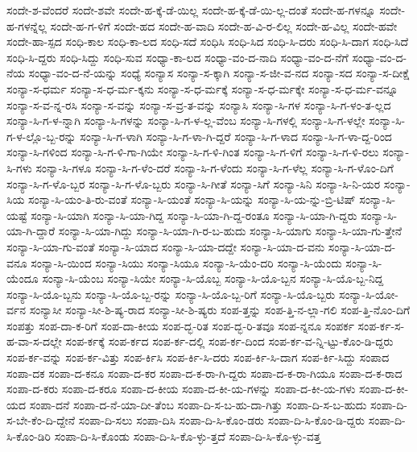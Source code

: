 {ಸಂದೇ-ಶ-ವೆಂದರೆ
ಸಂದೇ-ಶವೇ
ಸಂದೇ-ಹ-ಕ್ಕೆ-ಡೆ-ಯಿಲ್ಲ
ಸಂದೇ-ಹ-ಕ್ಕೆ-ಡೆ-ಯಿ-ಲ್ಲ-ದಂತೆ
ಸಂದೇ-ಹ-ಗಳನ್ನೂ
ಸಂದೇ-ಹ-ಗಳನ್ನೆಲ್ಲ
ಸಂದೇ-ಹ-ಗ-ಳಿಗೆ
ಸಂದೇ-ಹದ
ಸಂದೇ-ಹ-ವಾದಿ
ಸಂದೇ-ಹ-ವಿ-ರ-ಲಿಲ್ಲ
ಸಂದೇ-ಹ-ವಿಲ್ಲ
ಸಂದೇ-ಹವೇ
ಸಂದೇ-ಹಾ-ಸ್ಪದ
ಸಂಧಿ-ಕಾಲ
ಸಂಧಿ-ಕಾ-ಲದ
ಸಂಧಿ-ಸದೆ
ಸಂಧಿಸಿ
ಸಂಧಿ-ಸಿದ
ಸಂಧಿ-ಸಿ-ದರು
ಸಂಧಿ-ಸಿ-ದಾಗ
ಸಂಧಿ-ಸಿದೆ
ಸಂಧಿ-ಸಿ-ದ್ದರು
ಸಂಧಿ-ಸಿದ್ದು
ಸಂಧಿ-ಸುವ
ಸಂಧ್ಯಾ-ಕಾ-ಲದ
ಸಂಧ್ಯಾ-ವಂ-ದ-ನಾದಿ
ಸಂಧ್ಯಾ-ವಂ-ದ-ನೆಗೆ
ಸಂಧ್ಯಾ-ವಂ-ದ-ನೆಯ
ಸಂಧ್ಯಾ-ವಂ-ದ-ನೆ-ಯನ್ನು
ಸಂಧ್ಯೆ
ಸಂನ್ಯಾಸ
ಸಂನ್ಯಾ-ಸ-ಕ್ಕಾಗಿ
ಸಂನ್ಯಾ-ಸ-ಜೀ-ವ-ನದ
ಸಂನ್ಯಾ-ಸದ
ಸಂನ್ಯಾ-ಸ-ದೀಕ್ಷೆ
ಸಂನ್ಯಾ-ಸ-ಧರ್ಮ
ಸಂನ್ಯಾ-ಸ-ಧ-ರ್ಮ-ಕ್ಕನು
ಸಂನ್ಯಾ-ಸ-ಧ-ರ್ಮಕ್ಕೆ
ಸಂನ್ಯಾ-ಸ-ಧ-ರ್ಮಕ್ಕೇ
ಸಂನ್ಯಾ-ಸ-ಧ-ರ್ಮ-ವನ್ನೂ
ಸಂನ್ಯಾ-ಸ-ವ-ನ್ನ-ರಸಿ
ಸಂನ್ಯಾ-ಸ-ವನ್ನು
ಸಂನ್ಯಾ-ಸ-ವ್ರ-ತ-ವನ್ನು
ಸಂನ್ಯಾಸಿ
ಸಂನ್ಯಾ-ಸಿ-ಗಳ
ಸಂನ್ಯಾ-ಸಿ-ಗ-ಳಂ-ತ-ಲ್ಲದ
ಸಂನ್ಯಾ-ಸಿ-ಗ-ಳ-ನ್ನಾಗಿ
ಸಂನ್ಯಾ-ಸಿ-ಗಳನ್ನು
ಸಂನ್ಯಾ-ಸಿ-ಗ-ಳ-ಲ್ಲ-ವೆಂಬ
ಸಂನ್ಯಾ-ಸಿ-ಗಳಲ್ಲಿ
ಸಂನ್ಯಾ-ಸಿ-ಗ-ಳಲ್ಲೇ
ಸಂನ್ಯಾ-ಸಿ-ಗ-ಳ-ಲ್ಲೊ-ಬ್ಬ-ರನ್ನು
ಸಂನ್ಯಾ-ಸಿ-ಗ-ಳಾಗಿ
ಸಂನ್ಯಾ-ಸಿ-ಗ-ಳಾ-ಗಿ-ದ್ದರೆ
ಸಂನ್ಯಾ-ಸಿ-ಗ-ಳಾದ
ಸಂನ್ಯಾ-ಸಿ-ಗ-ಳಾ-ದ್ದ-ರಿಂದ
ಸಂನ್ಯಾ-ಸಿ-ಗಳಿಂದ
ಸಂನ್ಯಾ-ಸಿ-ಗ-ಳಿ-ಗಾ-ಗಿಯೇ
ಸಂನ್ಯಾ-ಸಿ-ಗ-ಳಿ-ಗಿಂತ
ಸಂನ್ಯಾ-ಸಿ-ಗ-ಳಿಗೆ
ಸಂನ್ಯಾ-ಸಿ-ಗ-ಳಿ-ರಲು
ಸಂನ್ಯಾ-ಸಿ-ಗಳು
ಸಂನ್ಯಾ-ಸಿ-ಗಳೂ
ಸಂನ್ಯಾ-ಸಿ-ಗ-ಳೆಂ-ದರೆ
ಸಂನ್ಯಾ-ಸಿ-ಗ-ಳೆಂದು
ಸಂನ್ಯಾ-ಸಿ-ಗ-ಳೆಲ್ಲ
ಸಂನ್ಯಾ-ಸಿ-ಗ-ಳೊಂ-ದಿಗೆ
ಸಂನ್ಯಾ-ಸಿ-ಗ-ಳೊ-ಬ್ಬರ
ಸಂನ್ಯಾ-ಸಿ-ಗ-ಳೊ-ಬ್ಬರು
ಸಂನ್ಯಾ-ಸಿ-ಗೀತೆ
ಸಂನ್ಯಾ-ಸಿಗೆ
ಸಂನ್ಯಾ-ಸಿನಿ
ಸಂನ್ಯಾ-ಸಿ-ನಿ-ಯರ
ಸಂನ್ಯಾ-ಸಿಯ
ಸಂನ್ಯಾ-ಸಿ-ಯಂ-ತಿ-ರು-ವಂತೆ
ಸಂನ್ಯಾ-ಸಿ-ಯಂತೆ
ಸಂನ್ಯಾ-ಸಿ-ಯನ್ನು
ಸಂನ್ಯಾ-ಸಿ-ಯ-ನ್ನು-ಬ್ರಿ-ಟಿಷ್
ಸಂನ್ಯಾ-ಸಿ-ಯಷ್ಟೆ
ಸಂನ್ಯಾ-ಸಿ-ಯಾಗಿ
ಸಂನ್ಯಾ-ಸಿ-ಯಾ-ಗಿದ್ದ
ಸಂನ್ಯಾ-ಸಿ-ಯಾ-ಗಿ-ದ್ದ-ರಂತೂ
ಸಂನ್ಯಾ-ಸಿ-ಯಾ-ಗಿ-ದ್ದರು
ಸಂನ್ಯಾ-ಸಿ-ಯಾ-ಗಿ-ದ್ದಾರೆ
ಸಂನ್ಯಾ-ಸಿ-ಯಾ-ಗಿದ್ದು
ಸಂನ್ಯಾ-ಸಿ-ಯಾ-ಗಿ-ರ-ಬ-ಹುದು
ಸಂನ್ಯಾ-ಸಿ-ಯಾಗು
ಸಂನ್ಯಾ-ಸಿ-ಯಾ-ಗು-ತ್ತೇನೆ
ಸಂನ್ಯಾ-ಸಿ-ಯಾ-ಗು-ವಂತೆ
ಸಂನ್ಯಾ-ಸಿ-ಯಾದ
ಸಂನ್ಯಾ-ಸಿ-ಯಾ-ದದ್ದೇ
ಸಂನ್ಯಾ-ಸಿ-ಯಾ-ದ-ವನು
ಸಂನ್ಯಾ-ಸಿ-ಯಾ-ದ-ವನೂ
ಸಂನ್ಯಾ-ಸಿ-ಯಿಂದ
ಸಂನ್ಯಾ-ಸಿಯು
ಸಂನ್ಯಾ-ಸಿಯೂ
ಸಂನ್ಯಾ-ಸಿ-ಯೆಂ-ದರಿ
ಸಂನ್ಯಾ-ಸಿ-ಯೆಂದು
ಸಂನ್ಯಾ-ಸಿ-ಯೆಂದೂ
ಸಂನ್ಯಾ-ಸಿ-ಯೆಂಬ
ಸಂನ್ಯಾ-ಸಿಯೇ
ಸಂನ್ಯಾ-ಸಿ-ಯೊಬ್ಬ
ಸಂನ್ಯಾ-ಸಿ-ಯೊ-ಬ್ಬನ
ಸಂನ್ಯಾ-ಸಿ-ಯೊ-ಬ್ಬ-ನಿದ್ದ
ಸಂನ್ಯಾ-ಸಿ-ಯೊ-ಬ್ಬನು
ಸಂನ್ಯಾ-ಸಿ-ಯೊ-ಬ್ಬ-ರನ್ನು
ಸಂನ್ಯಾ-ಸಿ-ಯೊ-ಬ್ಬ-ರಿಗೆ
ಸಂನ್ಯಾ-ಸಿ-ಯೊ-ಬ್ಬರು
ಸಂನ್ಯಾ-ಸಿ-ಯೋ-ರ್ವನ
ಸಂನ್ಯಾಸೀ
ಸಂನ್ಯಾ-ಸೀ-ಶಿ-ಷ್ಯ-ರಾದ
ಸಂನ್ಯಾ-ಸೀ-ಶಿ-ಷ್ಯರು
ಸಂಪ-ತ್ತನ್ನು
ಸಂಪ-ತ್ತಿ-ನ-ಲ್ಲಾ-ಗಲಿ
ಸಂಪ-ತ್ತಿ-ನೊಂ-ದಿಗೆ
ಸಂಪತ್ತು
ಸಂಪ-ದಾ-ಕ-ರಿಗೆ
ಸಂಪ-ದಾ-ಕೀಯ
ಸಂಪ-ದ್ಭ-ರಿತ
ಸಂಪ-ದ್ಭ-ರಿ-ತವೂ
ಸಂಪ-ನ್ನನೂ
ಸಂಪರ್ಕ
ಸಂಪ-ರ್ಕ-ಸ-ಹ-ವಾ-ಸ-ದಲ್ಲೇ
ಸಂಪ-ರ್ಕಕ್ಕೆ
ಸಂಪ-ರ್ಕದ
ಸಂಪ-ರ್ಕ-ದಲ್ಲಿ
ಸಂಪ-ರ್ಕ-ದಿಂದ
ಸಂಪ-ರ್ಕ-ವ-ನ್ನಿ-ಟ್ಟು-ಕೊಂ-ಡಿ-ದ್ದರು
ಸಂಪ-ರ್ಕ-ವನ್ನು
ಸಂಪ-ರ್ಕ-ವಿತ್ತು
ಸಂಪ-ರ್ಕಿಸಿ
ಸಂಪ-ರ್ಕಿ-ಸಿ-ದರು
ಸಂಪ-ರ್ಕಿ-ಸಿ-ದಾಗ
ಸಂಪ-ರ್ಕಿ-ಸಿದ್ದು
ಸಂಪಾದ
ಸಂಪಾ-ದಕ
ಸಂಪಾ-ದ-ಕನೂ
ಸಂಪಾ-ದ-ಕರ
ಸಂಪಾ-ದ-ಕ-ರಾ-ಗಿ-ದ್ದರು
ಸಂಪಾ-ದ-ಕ-ರಾ-ಗಿಯೂ
ಸಂಪಾ-ದ-ಕ-ರಾದ
ಸಂಪಾ-ದ-ಕರು
ಸಂಪಾ-ದ-ಕರೂ
ಸಂಪಾ-ದ-ಕೀಯ
ಸಂಪಾ-ದ-ಕೀ-ಯ-ಗಳನ್ನು
ಸಂಪಾ-ದ-ಕೀ-ಯ-ಗಳು
ಸಂಪಾ-ದ-ಕೀ-ಯದ
ಸಂಪಾ-ದನೆ
ಸಂಪಾ-ದ-ನೆ-ಯಾ-ದೀ-ತೆಂಬ
ಸಂಪಾ-ದಿ-ಸ-ಬ-ಹು-ದಾ-ಗಿತ್ತು
ಸಂಪಾ-ದಿ-ಸ-ಬ-ಹುದು
ಸಂಪಾ-ದಿ-ಸ-ಬೇ-ಕೆಂ-ದಿ-ದ್ದೇನೆ
ಸಂಪಾ-ದಿ-ಸಲು
ಸಂಪಾ-ದಿಸಿ
ಸಂಪಾ-ದಿ-ಸಿ-ಕೊಂ-ಡರು
ಸಂಪಾ-ದಿ-ಸಿ-ಕೊಂ-ಡಿ-ದ್ದರು
ಸಂಪಾ-ದಿ-ಸಿ-ಕೊಂ-ಡಿರಿ
ಸಂಪಾ-ದಿ-ಸಿ-ಕೊಂಡು
ಸಂಪಾ-ದಿ-ಸಿ-ಕೊ-ಳ್ಳು-ತ್ತದೆ
ಸಂಪಾ-ದಿ-ಸಿ-ಕೊ-ಳ್ಳು-ವತ್ತ
}
